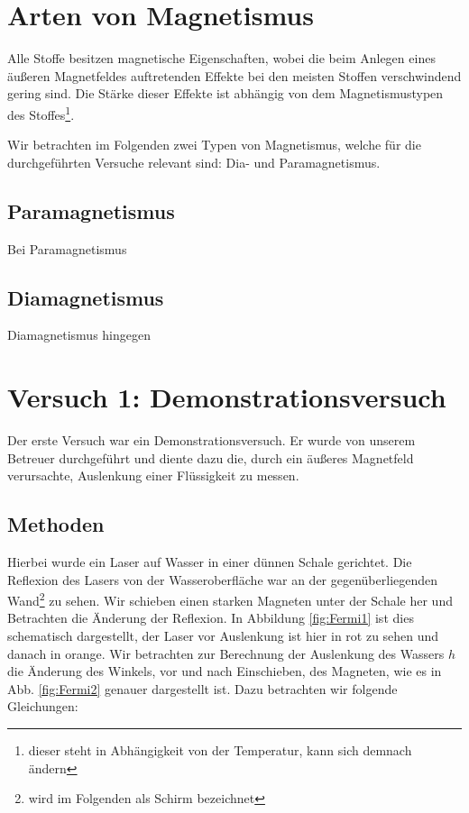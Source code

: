 \documentclass[11pt,a4paper,titlepage, ngerman]{article}
\begin{document}
	\section{Arten von Magnetismus}
				
		Alle Stoffe besitzen magnetische Eigenschaften, wobei die beim Anlegen eines äußeren Magnetfeldes auftretenden Effekte bei den meisten Stoffen verschwindend gering sind. Die \glqq Stärke \grqq dieser Effekte ist abhängig von dem Magnetismustypen des Stoffes\footnote{dieser steht in Abhängigkeit von der Temperatur, kann sich demnach ändern}. 
				
		Wir betrachten im Folgenden zwei Typen von Magnetismus, welche für die durchgeführten Versuche relevant sind: Dia- und Paramagnetismus.
		
		\subsection{Paramagnetismus}
			
			Bei Paramagnetismus %
			
			
		\subsection{Diamagnetismus}
		
			Diamagnetismus hingegen %
			
			
	\section{Versuch 1: Demonstrationsversuch} 
		
		Der erste Versuch war ein Demonstrationsversuch. Er wurde von unserem Betreuer durchgeführt und diente dazu die, durch ein äußeres Magnetfeld verursachte, Auslenkung einer Flüssigkeit zu messen.
		
		\subsection*{Methoden} 
		
		Hierbei wurde ein Laser auf Wasser in einer dünnen Schale gerichtet. Die Reflexion des Lasers von der Wasseroberfläche war an der gegenüberliegenden Wand\footnote{wird im Folgenden als Schirm bezeichnet} zu sehen. Wir schieben einen starken Magneten unter der Schale her und Betrachten die Änderung der Reflexion.
		In Abbildung \ref{fig:Fermi1} ist dies schematisch dargestellt, der Laser vor Auslenkung ist hier in rot zu sehen und danach in orange. Wir betrachten zur Berechnung der Auslenkung des Wassers $h$ die Änderung des Winkels, vor und nach Einschieben, des Magneten, wie es in Abb. \ref{fig:Fermi2} genauer dargestellt ist. Dazu betrachten wir folgende Gleichungen:
		
\end{document}
